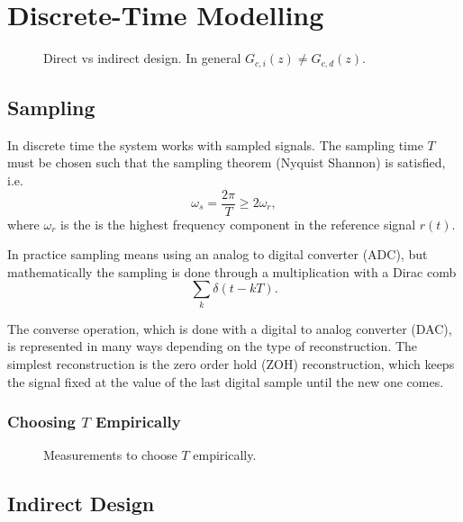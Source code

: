 
\section{Discrete-Time Modelling}

\begin{figure}
	\centering
	
	\caption{
		Direct vs indirect design. In general \(G_{c,i}(z) \neq G_{c,d}(z)\).
		\label{fig:direct-vs-indirect}
	}
\end{figure}

\subsection{Sampling}

In discrete time the system works with sampled signals. The sampling time \(T\) must be chosen such that the sampling theorem (Nyquist Shannon) is satisfied, i.e.
\[
	\omega_s = \frac{2\pi}{T} \geq 2 \omega_r,
\]
where \(\omega_r\) is the is the highest frequency component in the reference signal \(r(t)\).

In practice sampling means using an analog to digital converter (ADC), but mathematically the sampling is done through a multiplication with a Dirac comb
\[
	\sum_k \delta(t - kT).
\]

The converse operation, which is done with a digital to analog converter (DAC), is represented in many ways depending on the type of reconstruction. The simplest reconstruction is the zero order hold (ZOH) reconstruction, which keeps the signal fixed at the value of the last digital sample until the new one comes.

\subsubsection{Choosing \(T\) Empirically}


\begin{figure}
	\centering
	\skelfig[width = .9\linewidth, height = 3cm]
	\vskip 1mm
	\skelfig[width = .9\linewidth, height = 3cm]
	\caption{
		Measurements to choose \(T\) empirically.
	}
\end{figure}

\subsection{Indirect Design}

